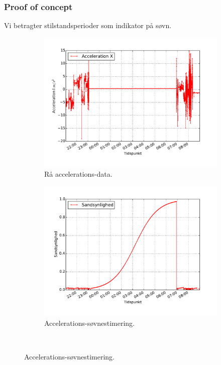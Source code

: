 \begin{frame}
\frametitle{Proof of concept}
Vi betragter stilstandsperioder som indikator på søvn.

\begin{figure}
	\begin{minipage}{\linewidth}
		\begin{subfigure}{0.5\linewidth}
			\centering
			\includegraphics[scale=0.27, trim = 1cm 1cm 1cm 1cm, clip]{../Report/grafik/kombi_figur/acceleration-plot}
			\caption{Rå accelerations-data.}\label{fig:rawaccplot}
		\end{subfigure}
		\begin{subfigure}{0.5\linewidth}
			\centering
			\includegraphics[scale=0.27, trim = 1cm 1cm 1cm 1cm, clip]{../Report/grafik/kombi_figur/acceleration-sleep-estimate-plot}
			\caption{Accelerations-søvnestimering.}\label{fig:sleepcalcaccplot}
		\end{subfigure}
	\end{minipage}\\[1ex]%
\end{figure}
\end{frame}

